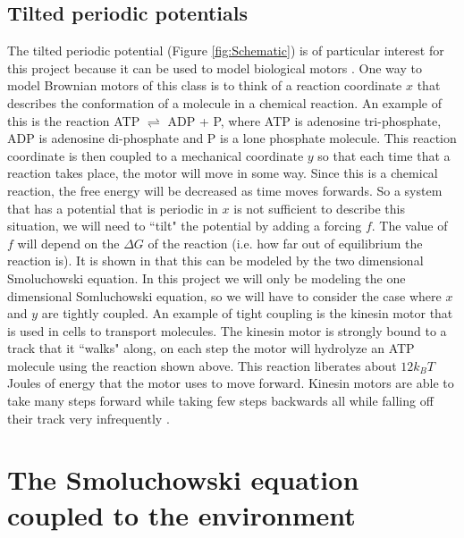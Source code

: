 \subsection{Tilted periodic potentials}
The tilted periodic potential (Figure \ref{fig:Schematic}) is of particular interest for this project because it can be used to model biological motors \cite{Leibler1993,Magnasco1994}. One way to model Brownian motors of this class is to think of a reaction coordinate $x$ that describes the conformation of a molecule in a chemical reaction. An example of this is the reaction ATP $\rightleftharpoons$ ADP + P, where ATP is adenosine tri-phosphate, ADP is adenosine di-phosphate and P is a lone phosphate molecule. This reaction coordinate is then coupled to a mechanical coordinate $y$ so that each time that a reaction takes place, the motor will move in some way. Since this is a chemical reaction, the free energy will be decreased as time moves forwards. So a system that has a potential that is periodic in $x$ is not sufficient to describe this situation, we will need to ``tilt" the potential by adding a forcing $f$. The value of $f$ will depend on the $\Delta G$ of the reaction (i.e. how far out of equilibrium the reaction is). It is shown in \cite{Magnasco1994} that this can be modeled by the two dimensional Smoluchowski equation. In this project we will only be modeling the one dimensional Somluchowski equation, so we will have to consider the case where $x$ and $y$ are tightly coupled. An example of tight coupling is the kinesin motor \cite{Leibler1993} that is used in cells to transport molecules. The kinesin motor is strongly bound to a track that it ``walks" along, on each step the motor will hydrolyze an ATP molecule using the reaction shown above. This reaction liberates about $12 k_B T$ Joules of energy that the motor uses to move forward. Kinesin motors are able to take many steps forward while taking few steps backwards all while falling off their track very infrequently \cite{BlockSM1990}.

\section{The Smoluchowski equation coupled to the environment} \label{Smoluchowski}

